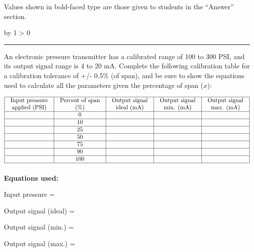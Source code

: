 \documentclass[12pt,a4paper]{article}
\def\oppgave{
            \advance\questnum by 1
            \ifnum \questnum > 0
                 \hrule
                 \vskip 3pt
                 \leftline{Oppgave \the\questnum}
                 \vskip 3pt \fi}
\begin{document}
Values shown in bold-faced type are those given to students in the ``Answer'' section.


\vfil \eject 



\oppgave{} 

An electronic pressure transmitter has a calibrated range of 100 to 300 PSI, and its output signal range is 4 to 20 mA.  Complete the following calibration table for a calibration tolerance of +/- 0.5\% (of span), and be sure to show the equations used to calculate all the parameters given the percentage of span ($x$):


$$\vbox{\offinterlineskip
\halign{\strut
\vrule \quad\hfil # \ \hfil & 
\vrule \quad\hfil # \ \hfil & 
\vrule \quad\hfil # \ \hfil & 
\vrule \quad\hfil # \ \hfil & 
\vrule \quad\hfil # \ \hfil \vrule \cr
\noalign{\hrule}
%
Input pressure & Percent of span & Output signal & Output signal & Output signal \cr
%
applied (PSI) & (\%) & ideal (mA) & min. (mA) & max. (mA) \cr
%
\noalign{\hrule}
%
 & 0 &  &  &  \cr
%
\noalign{\hrule}
%
 & 10 &  &  &  \cr
%
\noalign{\hrule}
%
 & 25 &  &  &  \cr
%
\noalign{\hrule}
%
 & 50 &  &  &  \cr
%
\noalign{\hrule}
%
 & 75 &  &  &  \cr
%
\noalign{\hrule}
%
 & 90 &  &  &  \cr
%
\noalign{\hrule}
%
 & 100 &  &  &  \cr
%
\noalign{\hrule}
} %
}$$ %

\vskip 10pt

\noindent
{\bf Equations used:}

\vskip 20pt

Input pressure = 

\vskip 20pt

Output signal (ideal) = 

\vskip 20pt

Output signal (min.) = 

\vskip 20pt

Output signal (max.) = 
\end{document}
